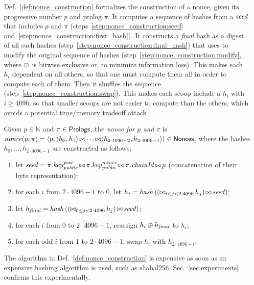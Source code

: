 Def.~\ref{def:nonce_construction} formalizes the construction of a nonce,
given its progressive number $p$ and prolog $\pi$.
It computes a sequence of hashes from a ${\mathit{seed}}$ that includes $p$ and $\pi$
(steps~\ref{step:nonce_construction:seed}
and~\ref{step:nonce_construction:first_hash}).
It constructs a \emph{final} hash as a digest of
all such hashes (step~\ref{step:nonce_construction:final_hash}) that uses to modify
the original sequence of hashes (step~\ref{step:nonce_construction:modify}, where $\oplus$
is bitwise exclusive or, to minimize information loss). This makes each $h_i$ dependent
on all others, so that one must compute them all in order to compute each of them.
Then it shuffles the sequence (step~\ref{step:nonce_construction:swap}).
This makes each scoop include a $h_i$ with $i\ge 4096$,
so that smaller scoops are not easier to compute than the others, which avoids a potential
time/memory tradeoff attack~\cite{ParkKFGAP18}.
%
\begin{definition}[$\nonce(p,\pi)$]\label{def:nonce_construction}
  Given $p\in\mathbb{N}$ and $\pi\in{\mathsf{Prologs}}$, the \emph{nonce for $p$ and $\pi$} is
  $
  {\mathit{nonce}}(p,\pi)=\langle p,\langle h_0,h_1\rangle\operatorname*{\bowtie}
  \cdots\operatorname*{\bowtie}\langle h_{2\cdot 4096-2},h_{2\cdot 4096-1}\rangle\rangle\in{\mathsf{Nonces}}
  $,
  where the hashes $h_0,\ldots,h_{2\cdot 4096-1}$ are constructed as follows:
  \begin{enumerate}
  \item\label{step:nonce_construction:seed} let ${\mathit{seed}}=\pi.\mathit{key}^{\mathit{peer}}_{{\mathit{public}}}\operatorname*{\bowtie}
    \pi.\mathit{key}^{\mathit{miner}}_{{\mathit{public}}}\operatorname*{\bowtie}\pi.{\mathit{chainId}}\operatorname*{\bowtie} p$ (concatenation of their byte representation);
  \item\label{step:nonce_construction:first_hash}
    for each $i$ from $2\cdot 4096-1$ to $0$, let
    $h_i={\mathit{hash}}\left(\left(\operatorname*{\bowtie}_{i<j<2\cdot 4096}h_j\right)\operatorname*{\bowtie}{\mathit{seed}}\right)$;
  \item\label{step:nonce_construction:final_hash}
    let ${h_{\mathit{final}}}={\mathit{hash}}\left(\left(\operatorname*{\bowtie}_{0\le j<2\cdot 4096}h_j\right)\operatorname*{\bowtie}{\mathit{seed}}\right)$;
  \item\label{step:nonce_construction:modify} for each $i$ from $0$ to $2\cdot 4096-1$, reassign
    $h_i\oplus{h_{\mathit{final}}}$ to $h_i$;
  \item\label{step:nonce_construction:swap}
    for each odd $i$ from $1$ to $2\cdot 4096-1$, swap $h_i$ with $h_{2\cdot 4096-i}$.
  \end{enumerate}
\end{definition}
%
The algorithm in Def.~\ref{def:nonce_construction} is expensive as soon as an expensive
hashing algorithm is used, such as shabal256. Sec.~\ref{sec:experiments} confirms this experimentally.

